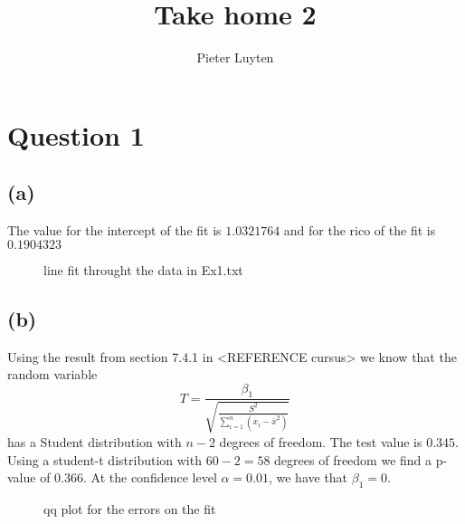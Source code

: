 \documentclass[a4paper]{article}
\title{Take home 2}
\author{Pieter Luyten}
\begin{document}
\maketitle

\section*{Question 1}
\subsection*{(a)}
The value for the intercept of the fit is $1.0321764$ and for the rico of the fit is $0.1904323$
\begin{figure}[h]
	\centering
	
	\caption{line fit throught the data in Ex1.txt}
	\label{fig:fit-1a}
\end{figure}

\subsection*{(b)}
Using the result from section 7.4.1 in <REFERENCE cursus> we know that the random variable
\begin{equation}
	T = \frac{\beta_1}{\sqrt{ \frac{S^2}{ \sum_{i=1}^{n}(x_i-\bar{x}^2)}}}
\end{equation}
has a Student distribution with $n-2$ degrees of freedom. The test value is $0.345$. Using a student-t distribution with $60-2=58$ degrees of freedom we find a p-value of $0.366$. At the confidence level $\alpha=0.01$, we have that $\beta_1=0$.

\begin{figure}[h]
	\centering
	
	\caption{qq plot for the errors on the fit}
	\label{fig:qqplot-1c}
\end{figure}

\end{document}
